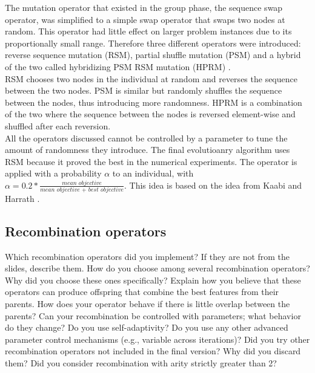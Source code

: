 \documentclass[a4paper,10pt]{article}
\newcommand{\ReplaceMe}[1]{{\color{blue}#1}}
\begin{document}
The mutation operator that existed in the group phase, the sequence swap operator, was simplified to a simple swap operator that swaps two nodes at random. This operator had little effect on larger problem instances due to its proportionally small range. Therefore three different operators were introduced: reverse sequence mutation (RSM), partial shuffle mutation (PSM) and a hybrid of the two called hybridizing PSM RSM mutation (HPRM) \cite{hprm}.\\
RSM chooses two nodes in the individual at random and reverses the sequence between the two nodes. PSM is similar but randomly shuffles the sequence between the nodes, thus introducing more randomness. HPRM is a combination of the two where the sequence between the nodes is reversed element-wise and shuffled after each reversion.\\
All the operators discussed cannot be controlled by a parameter to tune the amount of randomness they introduce. The final evolutioanry algorithm uses RSM because it proved the best in the numerical experiments. The operator is applied with a probability $\alpha$ to an individual, with $\alpha = 0.2 *\frac{ \textit{mean objective}}{\textit{mean objective } + \textit{ best objective}}$. This idea is based on the idea from Kaabi and Harrath \cite{ann}. 

\subsection{Recombination operators}

\ReplaceMe{Which recombination operators did you implement? If they are not from the slides, describe them. How do you choose among several recombination operators? Why did you choose these ones specifically? Explain how you believe that these operators can produce offspring that combine the best features from their parents. How does your operator behave if there is little overlap between the parents? Can your recombination be controlled with parameters; what behavior do they change? Do you use self-adaptivity? Do you use any other advanced parameter control mechanisms (e.g., variable across iterations)? Did you try other recombination operators not included in the final version? Why did you discard them? Did you consider recombination with arity strictly greater than 2?}
\end{document}
